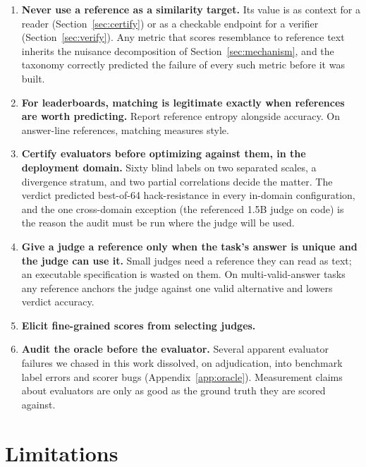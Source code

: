 \documentclass[11pt]{article}
\begin{document}
\begin{enumerate}
\item \textbf{Never use a reference as a similarity target.}
Its value is as context for a reader (Section~\ref{sec:certify}) or as a checkable endpoint for a verifier (Section~\ref{sec:verify}).
Any metric that scores resemblance to reference text inherits the nuisance decomposition of Section~\ref{sec:mechanism}, and the taxonomy correctly predicted the failure of every such metric before it was built.
\item \textbf{For leaderboards, matching is legitimate exactly when references are worth predicting.}
Report reference entropy alongside accuracy.
On answer-line references, matching measures style.
\item \textbf{Certify evaluators before optimizing against them, in the deployment domain.}
Sixty blind labels on two separated scales, a divergence stratum, and two partial correlations decide the matter.
The verdict predicted best-of-64 hack-resistance in every in-domain configuration, and the one cross-domain exception (the referenced 1.5B judge on code) is the reason the audit must be run where the judge will be used.
\item \textbf{Give a judge a reference only when the task's answer is unique and the judge can use it.}
Small judges need a reference they can read as text; an executable specification is wasted on them.
On multi-valid-answer tasks any reference anchors the judge against one valid alternative and lowers verdict accuracy.
\item \textbf{Elicit fine-grained scores from selecting judges.}
\item \textbf{Audit the oracle before the evaluator.}
Several apparent evaluator failures we chased in this work dissolved, on adjudication, into benchmark label errors and scorer bugs (Appendix~\ref{app:oracle}).
Measurement claims about evaluators are only as good as the ground truth they are scored against.
\end{enumerate}

\section{Limitations}
\label{sec:limits}
\end{document}
